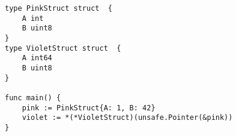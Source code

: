 \begin{lstlisting}[language=Golang, label=lst:architecture-dependent-types-cast, caption=Incorrect cast between architecture-dependent types]
type PinkStruct struct  {
    A int
    B uint8
}
type VioletStruct struct  {
    A int64
    B uint8
}

func main() {
    pink := PinkStruct{A: 1, B: 42}
    violet := *(*VioletStruct)(unsafe.Pointer(&pink))
}
\end{lstlisting}